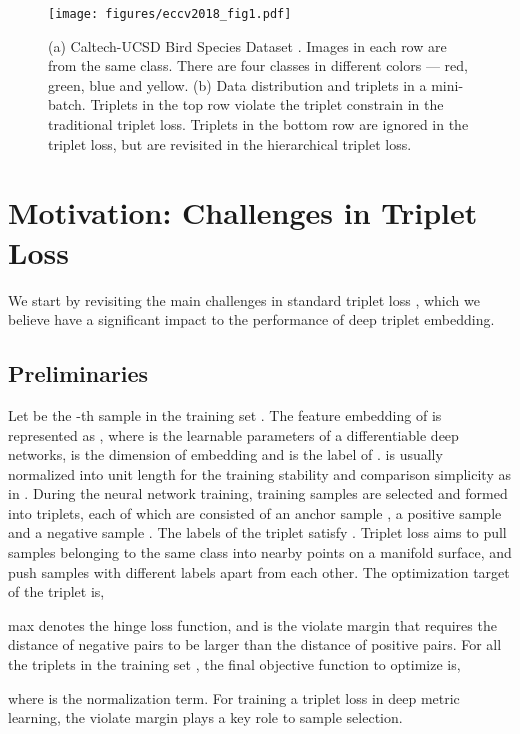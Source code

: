\documentclass[runningheads]{llncs}
\begin{document}
\begin{figure*}[t]
  \centering
  \texttt{[image: figures/eccv2018\_fig1.pdf]}
  \caption{(a) Caltech-UCSD Bird Species Dataset \cite{wah2011caltech}. Images in each row are from the same class. There are four classes in different colors --- red, green, blue and yellow. (b) Data distribution and triplets in a mini-batch. Triplets in the top row violate the triplet constrain in the traditional triplet loss. Triplets in the bottom row are ignored in the triplet loss, but are revisited in the hierarchical triplet loss.}
  \label{Fig:Triplet loss and Hierarchical Loss}
\end{figure*}     \section{Motivation: Challenges in Triplet Loss}
We start by revisiting the main challenges in standard triplet loss \cite{schroff2015facenet}, which we believe have a significant impact to the performance of deep triplet embedding. 


\subsection{Preliminaries}
Let  be the -th sample in the training set . The feature embedding of  is represented as , where  is the learnable parameters of a differentiable deep networks,  is the dimension of embedding and  is the label of .  is usually normalized into unit length for the training stability and comparison simplicity as in \cite{schroff2015facenet}. During the neural network training, training samples are selected and formed into triplets, each of which  are consisted of an anchor sample , a positive sample  and a negative sample . The labels of the triplet  satisfy . Triplet loss aims to pull samples belonging to the same class into nearby points on a manifold surface, and push samples with different labels apart from each other. The optimization target of the triplet  is,


 max denotes the hinge loss function, and  is the violate margin that requires the distance  of negative pairs to be larger than the distance  of positive pairs. For all the triplets  in the training set , the final objective function to optimize is,

    
where  is the normalization term. For training a triplet loss in deep metric learning, the violate margin plays a key role to sample selection.
\end{document}
